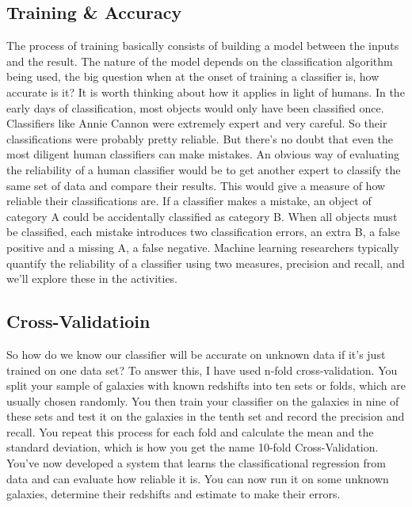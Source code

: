 \subsection{Training \& Accuracy}
The process of training basically consists of building a model between the inputs and the result. The nature of the model depends on the classification algorithm being used, the big question when at the onset of training a classifier is, how accurate is it? It is worth thinking about how it applies in light of humans. In the early days of classification, most objects would only have been classified once. Classifiers like Annie Cannon were extremely expert and very careful. So their classifications were probably pretty reliable. But there's no doubt that even the most diligent human classifiers can make mistakes. An obvious way of evaluating the reliability of a human classifier would be to get another expert to classify the same set of data and compare their results. This would give  a measure of how reliable their classifications are. If a classifier makes a mistake, an object of category A could be accidentally classified as category B. When all objects must be classified, each mistake introduces two classification errors, an extra B, a false positive and a missing A, a false negative. Machine learning researchers typically quantify the reliability of a classifier using two measures, precision and recall, and we'll explore these in the activities.

\subsection{Cross-Validatioin}
So how do we know our classifier will be accurate on unknown data if it's just trained on one data set? To answer this, I have used n-fold cross-validation. You split your sample of galaxies with known redshifts into ten sets or folds, which are usually chosen randomly. You then train your classifier on the galaxies in nine of these sets and test it on the galaxies in the tenth set and record the precision and recall. You repeat this process for each fold and calculate the mean and the standard deviation, which is how you get the name 10-fold Cross-Validation. You've now developed a system that learns the classificational regression from data and can evaluate how reliable it is. You can now run it on some unknown galaxies, determine their redshifts and estimate to make their errors.